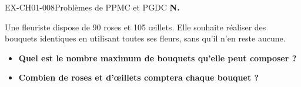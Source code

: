 \documentclass[12pt, a4paper]{article}
\begin{document}
\begin{exercice}{EX-CH01-008}{Problèmes de PPMC et PGDC}
\bigskip\textbf{N.}

\medskip
Une fleuriste dispose de 90 roses et 105 œillets. Elle souhaite réaliser des bouquets identiques en utilisant toutes ses fleurs, sans qu'il n'en reste aucune.

\begin{itemize}[label=$\blacktriangleright$]
\item \textbf{Quel est le nombre maximum de bouquets qu'elle peut composer ?}
\item \textbf{Combien de roses et d'œillets comptera chaque bouquet ?}
\end{itemize}

\end{exercice}
\end{document}
